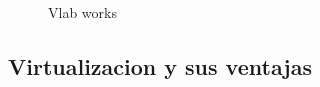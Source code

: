 \begin{figure}[!htb]
    \centering
    \caption{Vlab works}
    \label{fig:vlab-presentation}
\end{figure}

\subsection{Virtualizacion y sus ventajas}
